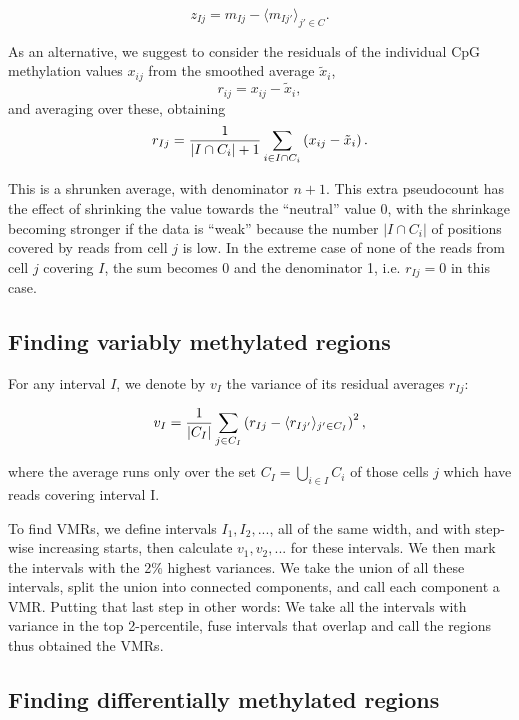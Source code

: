 \documentclass[twocolumn,10pt]{article}
\begin{document}
\[ z_{Ij} = m_{Ij} - \langle m_{Ij'}\rangle_{j'\in C}.\]

As an alternative, we suggest to consider the residuals of the individual CpG methylation values $x_{ij}$ from the smoothed average $\tilde x_i$,
\[ r_{ij} = x_{ij} - \tilde x_i, \]
and averaging over these, obtaining
\begin{equation} 
r_{Ij} = \frac{\scriptsize{1}}{\scriptsize{|I\cap C_i|+1}}\sum_{i\in I\cap C_i}\left( x_{ij} - \tilde x_i \right).
\label{avgres}
\end{equation}

This is a shrunken average, with denominator $n+1$.
This extra pseudocount has the effect of shrinking the value towards the ``neutral'' value 0, with the shrinkage becoming stronger if the data is ``weak'' because the number $|I\cap C_i|$ of positions covered by reads from cell $j$  is low.
In the extreme case of none of the reads from cell $j$ covering $I$, the sum becomes 0 and the denominator 1, i.e.
$r_{Ij}=0$ in this case.

\subsection{Finding variably methylated regions}

For any interval $I$, we denote by $v_I$ the variance of its residual averages $r_{Ij}$:

\begin{equation} 
v_I = \frac{\scriptsize{1}}{\scriptsize{|C_I|}}\sum_{j\in C_I}\left( r_{Ij} - \langle r_{Ij'}\rangle_{j'\in C_I} \right)^2, \label{var}
\end{equation}

where the average runs only over the set $C_I=\bigcup_{i\in I}C_i$ of those cells $j$ which have reads covering interval I.

To find VMRs, we define intervals $I_1, I_2, ...$, all of the same width, and with step-wise increasing starts, then calculate $v_1, v_2, ...$ for these intervals.
We then mark the intervals with the 2\% highest variances.
We take the union of all these intervals, split the union into connected components, and call each component a VMR.
Putting that last step in other words:
We take all the intervals with variance in the top 2-percentile, fuse intervals that overlap and call the regions thus obtained the VMRs.

\subsection{Finding differentially methylated regions}
\end{document}
